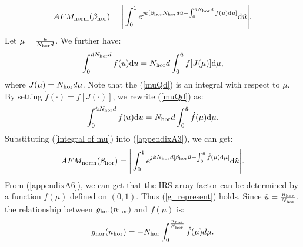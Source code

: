 \documentclass[12pt,draftclsnofoot,onecolumn]{IEEEtran}
\begin{document}
	\begin{equation}\label{continuous array}
		AFM_{\rm norm}({\beta _{\rm hor}}) = \Bigg|\int_0^{1} {{e^{{\jmath}k[{\beta _{\rm hor}}N_{\rm hor}d\ddot{u} - \int_0^{\ddot{u}N_{\rm hor}d} {f(u){\rm d}u]} }}} {\rm d}\ddot{u}\Bigg|.
	\end{equation}	
	Let $\mu=\frac{u}{N_{\rm hor}d}$. We further have:
	\begin{equation}\label{muQd}
		\int_0^{\ddot{u}N_{\rm hor}d} {f(u){\rm d}u}=N_{\rm hor}d \int_0^{\ddot{u}} {f[J(\mu)]{\rm d}{\mu}},
	\end{equation}
	where $J(\mu)=N_{\rm hor}d\mu$.
	Note that the (\ref{muQd}) is an integral with respect to $\mu$. By setting $\dot{f}(\cdot)=f[J(\cdot)]$, we rewrite (\ref{muQd}) as:
	\begin{equation}\label{integral of mu}
		\int_0^{\ddot{u}N_{\rm hor}d} {f(u){\rm d}u}=N_{\rm hor}d \int_0^{\ddot{u}} {\dot{f}(\mu){\rm d}{\mu}}.
	\end{equation}   
	Substituting (\ref{integral of mu}) into (\ref{appendixA3}), we can get:  
	\begin{equation}\label{appendixA6}
		AFM_{\rm norm}({\beta _{\rm hor}}) = \Bigg|\int_0^1 {{e^{{\jmath}kN_{\rm hor}d[{\beta _{\rm hor}}\ddot{u}  - \int_0^{\ddot{u}} {\dot{f}(\mu){\rm d}{\mu}} ]}}} {\rm d}{\ddot{u}} \Bigg|.
	\end{equation}
	From (\ref{appendixA6}), we can get that the IRS array factor can be determined by a function $\dot{f}(\mu)$ defined on $(0,1)$. Thus (\ref{g_represent}) holds. Since $\ddot{u}=\frac{n_{\rm hor}}{N_{\rm hor}}$, the relationship between $g_{\rm hor}(n_{\rm hor})$ and $\dot{f}(\mu)$ is:
	\begin{equation}\label{g&fmu}
		{g_{\rm hor}}({n_{\rm hor}}) = -N_{\rm hor}\int_0^{\frac{{{n_{\rm hor}}}}{N_{\rm hor}}} {\dot{f}(\mu )d\mu }.
	\end{equation}
	
	
	
	
	
	
	
	\ifCLASSOPTIONcaptionsoff
	\newpage
	\fi
	
	
	
	
\end{document}
